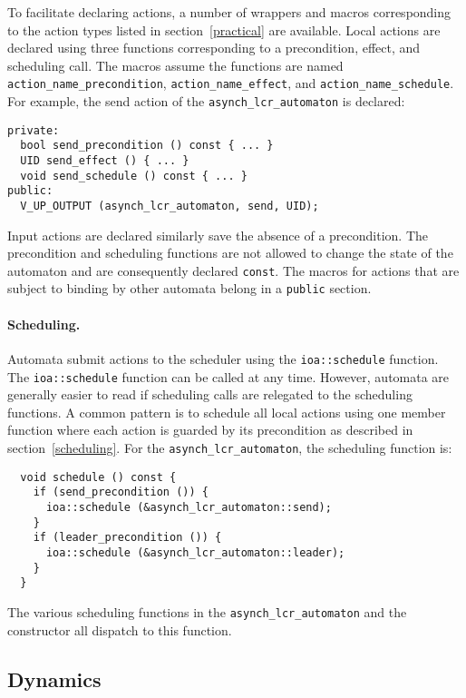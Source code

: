 To facilitate declaring actions, a number of wrappers and macros corresponding to the action types listed in section~\ref{practical} are available.
Local actions are declared using three functions corresponding to a precondition, effect, and scheduling call.
The macros assume the functions are named \verb+action_name_precondition+, \verb+action_name_effect+, and \verb+action_name_schedule+.
For example, the send action of the \verb+asynch_lcr_automaton+ is declared:
\begin{lstlisting}
private:
  bool send_precondition () const { ... }
  UID send_effect () { ... }
  void send_schedule () const { ... }
public:
  V_UP_OUTPUT (asynch_lcr_automaton, send, UID);
\end{lstlisting}
Input actions are declared similarly save the absence of a precondition.
The precondition and scheduling functions are not allowed to change the state of the automaton and are consequently declared \verb+const+.
The macros for actions that are subject to binding by other automata belong in a \verb+public+ section.

\paragraph{Scheduling.}
Automata submit actions to the scheduler using the \verb+ioa::schedule+ function.
The \verb+ioa::schedule+ function can be called at any time.
However, automata are generally easier to read if scheduling calls are relegated to the scheduling functions.
A common pattern is to schedule all local actions using one member function where each action is guarded by its precondition as described in section~\ref{scheduling}.
For the \verb+asynch_lcr_automaton+, the scheduling function is:
\begin{lstlisting}
  void schedule () const {
    if (send_precondition ()) {
      ioa::schedule (&asynch_lcr_automaton::send);
    }
    if (leader_precondition ()) {
      ioa::schedule (&asynch_lcr_automaton::leader);
    }
  }
\end{lstlisting}
The various scheduling functions in the \verb+asynch_lcr_automaton+ and the constructor all dispatch to this function.

\subsection{Dynamics}

